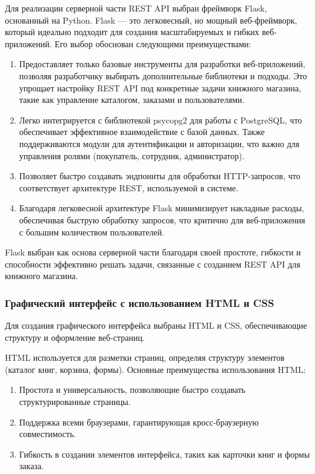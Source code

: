 Для реализации серверной части REST API выбран фреймворк Flask, основанный на Python. Flask — это легковесный, но мощный веб-фреймворк, который идеально подходит для создания масштабируемых и гибких веб-приложений. Его выбор обоснован следующими преимуществами:
\begin{enumerate}
	\item Предоставляет только базовые инструменты для разработки веб-приложений, позволяя разработчику выбирать дополнительные библиотеки и подходы. Это упрощает настройку REST API под конкретные задачи книжного магазина, такие как управление каталогом, заказами и пользователями.
	\item Легко интегрируется с библиотекой psycopg2 для работы с PostgreSQL, что обеспечивает эффективное взаимодействие с базой данных. Также поддерживаются модули для аутентификации и авторизации, что важно для управления ролями (покупатель, сотрудник, администратор).
	\item Позволяет быстро создавать эндпоинты для обработки HTTP-запросов, что соответствует архитектуре REST, используемой в системе.
	\item Благодаря легковесной архитектуре Flask минимизирует накладные расходы, обеспечивая быструю обработку запросов, что критично для веб-приложения с большим количеством пользователей.
\end{enumerate}

Flask выбран как основа серверной части благодаря своей простоте, гибкости и способности эффективно решать задачи, связанные с созданием REST API для книжного магазина.

\subsubsection{Графический интерфейс с использованием HTML и CSS}

Для создания графического интерфейса выбраны HTML и CSS, обеспечивающие структуру и оформление веб-страниц.

HTML используется для разметки страниц, определяя структуру элементов (каталог книг, корзина, формы).
Основные преимущества использования HTML:
\begin{enumerate}
	\item Простота и универсальность, позволяющие быстро создавать структурированные страницы.
	\item Поддержка всеми браузерами, гарантирующая кросс-браузерную совместимость.
	\item Гибкость в создании элементов интерфейса, таких как карточки книг и формы заказа.
\end{enumerate}

